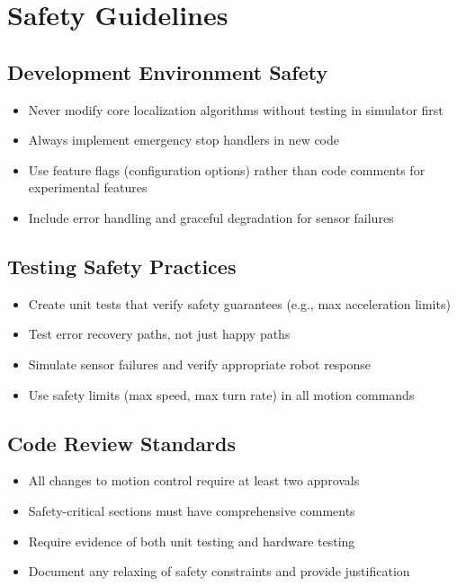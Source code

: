 %
%

\chapter{Safety Guidelines}

\section{Development Environment Safety}

\begin{itemize}
    \item Never modify core localization algorithms without testing in simulator first
    \item Always implement emergency stop handlers in new code
    \item Use feature flags (configuration options) rather than code comments for experimental features
    \item Include error handling and graceful degradation for sensor failures
\end{itemize}

\section{Testing Safety Practices}

\begin{itemize}
    \item Create unit tests that verify safety guarantees (e.g., max acceleration limits)
    \item Test error recovery paths, not just happy paths
    \item Simulate sensor failures and verify appropriate robot response
    \item Use safety limits (max speed, max turn rate) in all motion commands
\end{itemize}

\section{Code Review Standards}

\begin{itemize}
    \item All changes to motion control require at least two approvals
    \item Safety-critical sections must have comprehensive comments
    \item Require evidence of both unit testing and hardware testing
    \item Document any relaxing of safety constraints and provide justification
\end{itemize}

